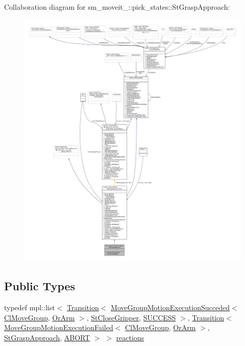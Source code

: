 Collaboration diagram for sm\+\_\+moveit\+\_\+:\+:pick\+\_\+states\+:\+:St\+Grasp\+Approach\+:
\nopagebreak
\begin{figure}[H]
\begin{center}
\leavevmode
\includegraphics[width=350pt]{structsm__moveit__4_1_1pick__states_1_1StGraspApproach__coll__graph}
\end{center}
\end{figure}
\subsection*{Public Types}
\begin{DoxyCompactItemize}
\item 
typedef mpl\+::list$<$ \hyperlink{classsmacc_1_1Transition}{Transition}$<$ \hyperlink{structmoveit__z__client_1_1MoveGroupMotionExecutionSucceded}{Move\+Group\+Motion\+Execution\+Succeded}$<$ \hyperlink{classmoveit__z__client_1_1ClMoveGroup}{Cl\+Move\+Group}, \hyperlink{classsm__moveit__4_1_1OrArm}{Or\+Arm} $>$, \hyperlink{structsm__moveit__4_1_1pick__states_1_1StCloseGripper}{St\+Close\+Gripper}, \hyperlink{structsmacc_1_1default__transition__tags_1_1SUCCESS}{S\+U\+C\+C\+E\+SS} $>$, \hyperlink{classsmacc_1_1Transition}{Transition}$<$ \hyperlink{structmoveit__z__client_1_1MoveGroupMotionExecutionFailed}{Move\+Group\+Motion\+Execution\+Failed}$<$ \hyperlink{classmoveit__z__client_1_1ClMoveGroup}{Cl\+Move\+Group}, \hyperlink{classsm__moveit__4_1_1OrArm}{Or\+Arm} $>$, \hyperlink{structsm__moveit__4_1_1pick__states_1_1StGraspApproach}{St\+Grasp\+Approach}, \hyperlink{structsmacc_1_1default__transition__tags_1_1ABORT}{A\+B\+O\+RT} $>$ $>$ \hyperlink{structsm__moveit__4_1_1pick__states_1_1StGraspApproach_a1c95028174302ddacbd6e793098a50a3}{reactions}
\end{DoxyCompactItemize}
